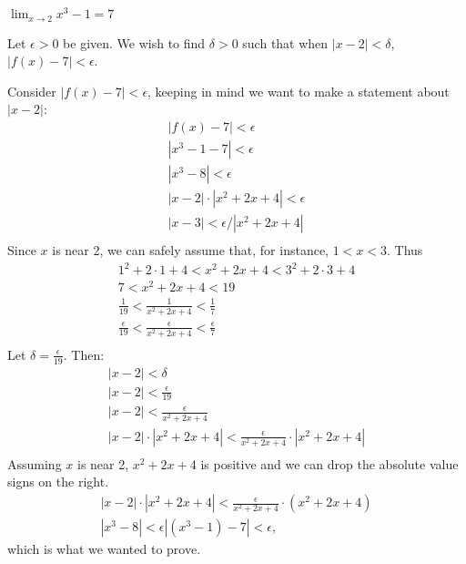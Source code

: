 {$\displaystyle \lim_{x\to 2} x^3-1 = 7$}
{Let $\epsilon >0$ be given. We wish to find $\delta >0$ such that when $|x-2|<\delta$, $|f(x)-7|<\epsilon$. 

Consider $|f(x)-7|<\epsilon$, keeping in  mind we want to make a statement about $|x-2|$:
\begin{gather*}
|f(x) -7 | < \epsilon \\
|x^3-1 -7 |<\epsilon \\
| x^3-8 | < \epsilon \\
| x-2 |\cdot|x^2+2x+4| < \epsilon \\
| x-3 | < \epsilon/|x^2+2x+4| \\
\end{gather*}
Since $x$ is near 2, we can safely assume that, for instance, $1<x<3$. Thus
\begin{gather*}
1^2+2\cdot1+4<x^2+2x+4<3^2+2\cdot3+4 \\
7 < x^2+2x+4 < 19 \\
\frac{1}{19} < \frac{1}{x^2+2x+4} < \frac{1}{7} \\
\frac{\epsilon}{19} < \frac{\epsilon}{x^2+2x+4} < \frac{\epsilon}{7} \\
\end{gather*}
Let $\delta =\frac{\epsilon}{19}$. Then:
\begin{gather*}
|x-2|<\delta \\
|x-2| < \frac{\epsilon}{19}\\
|x-2| < \frac{\epsilon}{x^2+2x+4}\\
|x-2|\cdot|x^2+2x+4| < \frac{\epsilon}{x^2+2x+4}\cdot|x^2+2x+4|\\
\end{gather*}
Assuming $x$ is near 2, $x^2+2x+4$ is positive and we can drop the absolute value signs on the right.
\begin{gather*}
|x-2|\cdot|x^2+2x+4| < \frac{\epsilon}{x^2+2x+4}\cdot(x^2+2x+4)\\
|x^3-8| < \epsilon
|(x^3-1) - 7| < \epsilon,
\end{gather*}
which is what we wanted to prove.
}



